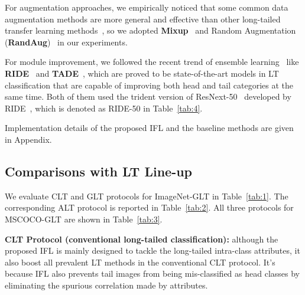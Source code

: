 \documentclass{article}
\begin{document}
For augmentation approaches, we empirically noticed that some common data augmentation methods are more general and effective than other long-tailed transfer learning methods~\cite{liu2020deep}, so we adopted \textbf{Mixup}~\cite{zhang2018mixup} and Random Augmentation (\textbf{RandAug})~\cite{cubuk2020randaugment} in our experiments.



For module improvement, we followed the recent trend of ensemble learning~\cite{wang2020long} like \textbf{RIDE}~\cite{wang2020long} and \textbf{TADE}~\cite{zhang2021test}, which are proved to be state-of-the-art models in LT classification that are capable of improving both head and tail categories at the same time. Both of them used the trident version of ResNext-50~\cite{xie2017aggregated} developed by RIDE~\cite{wang2020long}, which is denoted as RIDE-50 in Table~\ref{tab:4}.


Implementation details of the proposed IFL and the baseline methods are given in Appendix. 







\subsection{Comparisons with LT Line-up}



We evaluate CLT and GLT protocols for ImageNet-GLT in Table~\ref{tab:1}. The corresponding ALT protocol is reported in Table~\ref{tab:2}. All three protocols for MSCOCO-GLT are shown in Table~\ref{tab:3}.


\noindent\textbf{CLT Protocol (conventional long-tailed classification): } although the proposed IFL is mainly designed to tackle the long-tailed intra-class attributes, it also boost all prevalent LT methods in the conventional CLT protocol. It's because IFL also prevents tail images from being mis-classified as head classes by eliminating the spurious correlation made by attributes. 
\end{document}
